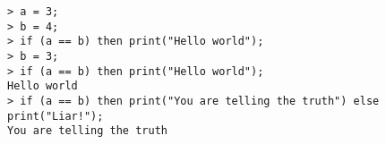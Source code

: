 \begin{center}\begin{minipage}{15cm}\begin{Verbatim}[frame=single]
> a = 3;
> b = 4;
> if (a == b) then print("Hello world");
> b = 3;
> if (a == b) then print("Hello world");
Hello world
> if (a == b) then print("You are telling the truth") else print("Liar!");
You are telling the truth
\end{Verbatim}
\end{minipage}\end{center}
